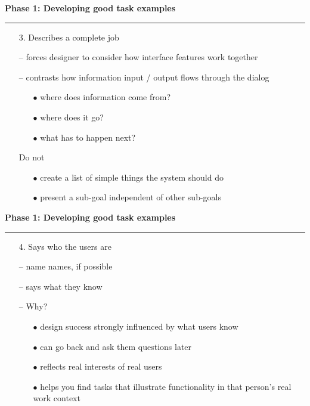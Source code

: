 \documentclass[pdf]{beamer}
\begin{document}
\begin{frame}
\vspace{8mm}
\textcolor{myBlue}{\textbf{\Large{Phase 1: Developing good task examples}}}

\textcolor{red}{\rule{10cm}{1mm}}	

\begin{itemize}
	\item[]  {\LARGE 3. Describes a complete job} \newline
	 \item[\textcolor{black}{--}]forces designer to consider how interface features work together
     \item[\textcolor{black}{--}]contrasts how information input / output flows through the dialog
     \begin{itemize}
      \item[{$\bullet$}]where does information come from?
      \item[{$\bullet$}]where does it go?
      \item[{$\bullet$}]what has to happen next?
     \end{itemize}
    \item[] {Do not}
    \begin{itemize}
    \item[{$\bullet$}]create a list of simple things the system should do
    \item[{$\bullet$}]present a sub-goal independent of other sub-goals
    \end{itemize}
\end{itemize}
\end{frame}



\begin{frame}
\vspace{8mm}
\textcolor{myBlue}{\textbf{\Large{Phase 1: Developing good task examples}}}

\textcolor{red}{\rule{10cm}{1mm}}	

\begin{itemize}
	\item[]  {\LARGE 4. Says who the users are} \newline
	 \item[\textcolor{black}{--}]name names, if possible
     \item[\textcolor{black}{--}]says what they know
     \bigskip
     \bigskip
     \item[\textcolor{black}{--}]Why?
      \begin{itemize}
      \item[{$\bullet$}]design success strongly influenced by what users know
      \item[{$\bullet$}]can go back and ask them questions later
      \item[{$\bullet$}]reflects real interests of real users
      \item[{$\bullet$}]helps you find tasks that illustrate functionality in that person’s real work context
     \end{itemize}
     \end{itemize}
\end{frame}
\end{document}

